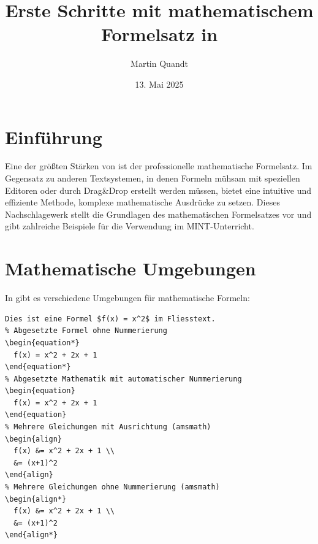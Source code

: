 \documentclass[12pt,a4paper]{article}
\title{Erste Schritte mit mathematischem Formelsatz in \hologo{LaTeX}}
\author{Martin Quandt}
\date{13. Mai 2025}
\begin{document}
\maketitle



\section{Einführung}

Eine der größten Stärken von  ist der professionelle mathematische Formelsatz. Im Gegensatz zu anderen Textsystemen, in denen Formeln mühsam mit speziellen Editoren oder durch Drag\&Drop erstellt werden müssen, bietet  eine intuitive und effiziente Methode, komplexe mathematische Ausdrücke zu setzen. Dieses Nachschlagewerk stellt die Grundlagen des mathematischen Formelsatzes vor und gibt zahlreiche Beispiele für die Verwendung im MINT-Unterricht.



\section{Mathematische Umgebungen}

In  gibt es verschiedene Umgebungen für mathematische Formeln:

\begin{lstlisting}[style=latex]
% Inline-Mathematik (im Fliesstext)
Dies ist eine Formel $f(x) = x^2$ im Fliesstext.
% Abgesetzte Formel ohne Nummerierung
\begin{equation*}
  f(x) = x^2 + 2x + 1
\end{equation*}
% Abgesetzte Mathematik mit automatischer Nummerierung
\begin{equation}
  f(x) = x^2 + 2x + 1
\end{equation}
% Mehrere Gleichungen mit Ausrichtung (amsmath)
\begin{align}
  f(x) &= x^2 + 2x + 1 \\
  &= (x+1)^2
\end{align}
% Mehrere Gleichungen ohne Nummerierung (amsmath)
\begin{align*}
  f(x) &= x^2 + 2x + 1 \\
  &= (x+1)^2
\end{align*}
\end{lstlisting}
\end{document}
